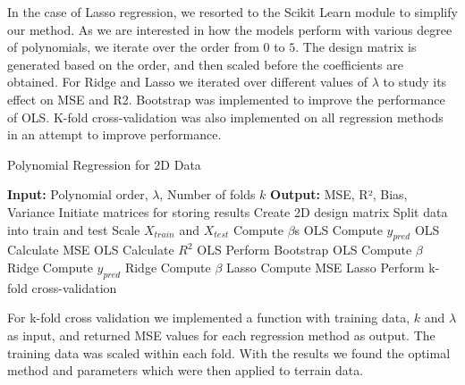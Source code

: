 \documentclass[aps,rmp,reprint,amsmath,amssymb,graphicx,longbibliography]{revtex4-1}
\begin{document}
In the case of Lasso regression, we resorted to the Scikit Learn module to simplify our method\cite{scikit-learn}. As we are interested in how the models perform with various degree of polynomials, we iterate over the order from $0$ to $5$. The design matrix is generated based on the order, and then scaled before the coefficients are obtained. For Ridge and Lasso we iterated over different values of $\lambda$ to study its effect on MSE and R2. Bootstrap was implemented to improve the performance of OLS. K-fold cross-validation was also implemented on all regression methods in an attempt to improve performance.

\begin{algorithm}
    \caption{Polynomial Regression for 2D Data}
    \begin{algorithmic}[1]
    \State \textbf{Input:} Polynomial order, $\lambda$, Number of folds $k$
    \State \textbf{Output:} MSE, R², Bias, Variance
    \State Initiate matrices for storing results
        \State Create 2D design matrix 
        \State Split data into train and test
        \State Scale $X_{train}$ and $X_{test}$
        \State Compute $\beta$s OLS
        \State Compute $y_{pred}$ OLS
        \State Calculate MSE OLS
        \State Calculate $R^2$ OLS
        \State Perform Bootstrap OLS
            \State Compute $\beta$ Ridge
            \State Compute $y_{pred}$ Ridge
            \State Compute $\beta$ Lasso
            \State Compute MSE Lasso
            \State Perform k-fold cross-validation
        \EndFor
    \EndFor
    \end{algorithmic}
\end{algorithm}

For k-fold cross validation we implemented a function with training data, $k$ and $\lambda$ as input, and returned MSE values for each regression method as output. The training data was scaled within each fold. With the results we found the optimal method and parameters which were then applied to terrain data.


\end{document}
